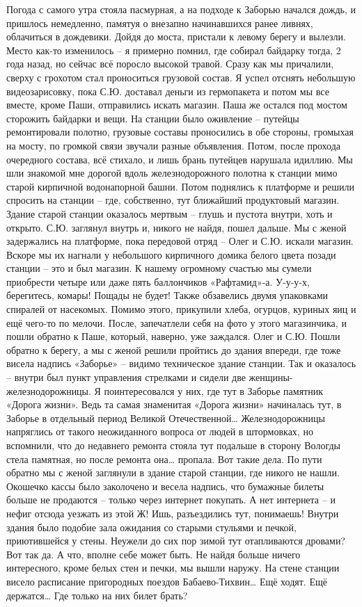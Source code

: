 Погода с самого утра стояла пасмурная, а на подходе к Заборью начался дождь, и пришлось немедленно, памятуя о внезапно начинавшихся ранее ливнях, облачиться в дождевики. Дойдя до моста, пристали к левому берегу и вылезли. Место как-то изменилось – я примерно помнил, где собирал байдарку тогда, 2 года назад, но сейчас всё поросло высокой травой.
Сразу как мы причалили, сверху с грохотом стал проноситься грузовой состав. Я успел отснять небольшую видеозарисовку, пока С.Ю. доставал деньги из гермопакета и потом мы все вместе, кроме Паши, отправились искать магазин. Паша же остался под мостом сторожить байдарки и вещи. 
На станции было оживление – путейцы ремонтировали полотно, грузовые составы проносились в обе стороны, громыхая на мосту, по громкой связи звучали разные объявления. Потом, после прохода очередного состава, всё стихало, и лишь брань путейцев нарушала идиллию. 
Мы шли знакомой мне дорогой вдоль железнодорожного полотна к станции мимо старой кирпичной водонапорной башни. Потом поднялись к платформе и решили спросить на станции – где, собственно, тут ближайший продуктовый магазин. Здание старой станции оказалось мертвым – глушь и пустота внутри, хоть и открыто. С.Ю. заглянул внутрь и, никого не найдя, пошел дальше. Мы с женой задержались на платформе, пока передовой отряд – Олег и С.Ю. искали магазин. Вскоре мы их нагнали у небольшого кирпичного домика белого цвета позади станции – это и был магазин. 
К нашему огромному счастью мы сумели приобрести четыре или даже пять баллончиков «Рафтамид»-а. У-у-у-х, берегитесь, комары! Пощады не будет! Также обзавелись двумя упаковками спиралей от насекомых. Помимо этого, прикупили хлеба, огурцов, куриных яиц и ещё чего-то по мелочи. После, запечатлели себя на фото у этого магазинчика, и пошли обратно к Паше, который, наверно, уже заждался.
Олег и С.Ю. Пошли обратно к берегу, а мы с женой решили пройтись до здания впереди, где тоже висела надпись «Заборье» – видимо техническое здание станции. Так и оказалось – внутри был пункт управления стрелками и сидели две женщины-железнодорожницы. Я поинтересовался у них, где тут в Заборье памятник «Дорога жизни». Ведь та самая знаменитая «Дорога жизни» начиналась тут, в Заборье в отдельный период Великой Отечественной… Железнодорожницы напряглись от такого неожиданного вопроса от людей в штормовках, но вспомнили, что до недавнего ремонта стояла тут подальше в сторону Вологды стела памятная, но после ремонта она… пропала. Вот такие дела.
По пути обратно мы с женой заглянули в здание старой станции, где никого не нашли. Окошечко кассы было заколочено и весела надпись, что бумажные билеты больше не продаются – только через интернет покупать. А нет интернета – и нефиг отсюда уезжать из этой Ж! Ишь, разъездились тут, понимаешь! Внутри здания было подобие зала ожидания со старыми стульями и печкой, приютившейся у стены. Неужели до сих пор зимой тут отапливаются дровами? Вот так да. А что, вполне себе может быть. Не найдя больше ничего интересного, кроме белых стен и печки, мы вышли наружу. На стене станции висело расписание пригородных поездов Бабаево-Тихвин… Ещё ходят. Ещё держатся… Где только на них билет брать?
